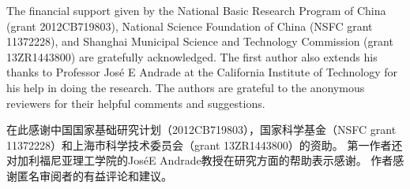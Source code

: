 \begin{ParaColumn}
    
    The financial support given by the National Basic Research Program of China (grant 2012CB719803), National Science Foundation of China (NSFC grant 11372228), and Shanghai Municipal Science and Technology Commission (grant 13ZR1443800) are gratefully acknowledged. The first author also extends his thanks to Professor José E Andrade at the California Institute of Technology for his help in doing the research. The authors are grateful to the anonymous reviewers for their helpful comments and suggestions.

    \switchcolumn

    在此感谢中国国家基础研究计划（2012CB719803），国家科学基金（NSFC grant 11372228）和上海市科学技术委员会（grant 13ZR1443800）的资助。 第一作者还对加利福尼亚理工学院的JoséE Andrade教授在研究方面的帮助表示感谢。 作者感谢匿名审阅者的有益评论和建议。
\end{ParaColumn}